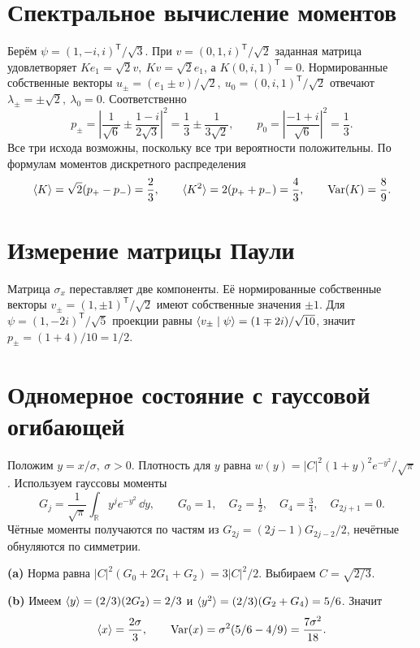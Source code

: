 \documentclass[11pt,a4paper]{article}
\begin{document}

\section{Спектральное вычисление моментов}

Берём \(\psi=(1,-i,i)^{\mathsf T}/\sqrt3\). При
\(v=(0,1,i)^{\mathsf T}/\sqrt2\) заданная матрица удовлетворяет
\(Ke_1=\sqrt2 v,\ Kv=\sqrt2 e_1\), а
\(K(0,i,1)^{\mathsf T}=0\). Нормированные собственные векторы
\(u_\pm=(e_1\pm v)/\sqrt2,\ u_0=(0,i,1)^{\mathsf T}/\sqrt2\)
отвечают \(\lambda_\pm=\pm\sqrt2,\ \lambda_0=0\).
Соответственно
\[
 p_\pm=\left|\frac1{\sqrt6}\pm\frac{1-i}{2\sqrt3}\right|^2
       =\frac13\pm\frac1{3\sqrt2},
 \qquad p_0=\left|\frac{-1+i}{\sqrt6}\right|^2=\frac13.
\]
Все три исхода возможны, поскольку все три вероятности положительны.
По формулам моментов дискретного распределения
\[
 \langle K\rangle=\sqrt2(p_+-p_-)=\frac23,\qquad
 \langle K^2\rangle=2(p_++p_-)=\frac43,\qquad \operatorname{Var}(K)=\frac89 .
\]

\section{Измерение матрицы Паули}

Матрица \(\sigma_x\) переставляет две компоненты. Её нормированные
собственные векторы \(v_\pm=(1,\pm1)^{\mathsf T}/\sqrt2\)
имеют собственные значения \(\pm1\).
Для \(\psi=(1,-2i)^{\mathsf T}/\sqrt5\) проекции равны
\(\langle v_\pm\mid \psi\rangle=(1\mp2i)/\sqrt{10}\), значит
\(p_\pm=(1+4)/10=1/2\).

\section{Одномерное состояние с гауссовой огибающей}

Положим \(y=x/\sigma,\ \sigma>0\). Плотность для \(y\)
равна \(w(y)=|C|^2(1+y)^2e^{-y^2}/\sqrt\pi\).
Используем гауссовы моменты
\[
 G_j=\frac1{\sqrt\pi}\int_{\mathbb R}y^j e^{-y^2}\,\dd y,\qquad
 G_0=1,\quad G_2=\tfrac12,\quad G_4=\tfrac34,\quad G_{2j+1}=0.
\]
Чётные моменты получаются по частям из
\(G_{2j}=(2j-1)G_{2j-2}/2\), нечётные обнуляются по симметрии.

\textbf{(a)} Норма равна \(|C|^2(G_0+2G_1+G_2)=3|C|^2/2\).
Выбираем \(C=\sqrt{2/3}\).

\textbf{(b)} Имеем \(\langle y\rangle=(2/3)(2G_2)=2/3\) и
\(\langle y^2\rangle=(2/3)(G_2+G_4)=5/6\). Значит
\[
 \langle x\rangle=\frac{2\sigma}{3},\qquad
 \operatorname{Var}(x)=\sigma^2(5/6-4/9)=\frac{7\sigma^2}{18}.
\]
\end{document}
